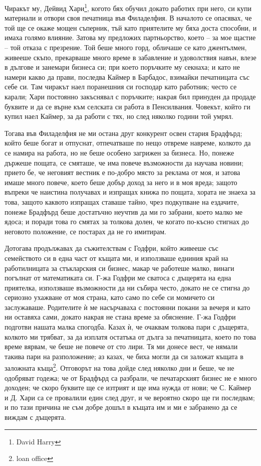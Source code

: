 \documentclass[12pt]{book}
\begin{document}
Чиракът му, Дейвид Хари\footnote{David Harry}, когото бях обучил докато работих при него, си купи материали и отвори своя печатница във Филаделфия. В началото се опасявах, че той ще се окаже мощен съперник, тъй като приятелите му бяха доста способни, и имаха голямо влияние. Затова му предложих партньорство, което – за мое щастие – той отказа с презрение. Той беше много горд, обличаше се като джентълмен, живееше скъпо, прекарваше много време в забавление и удоволствия навън, влезе в дългове и занемари бизнеса си; при което поръчките му секнаха; и като не намери какво да прави, последва Каймер в Барбадос, взимайки печатницата със себе си. Там чиракът наел поранешния си господар като работник; често се карали; Хари постоянно закъснявал с поръчките; накрая бил принуден да продаде буквите и да се върне към селската си работа в Пенсилвания. Човекът, който ги купил наел Каймер, за да работи с тях, но след няколко години той умрял.

Тогава във Филаделфия не ми остана друг конкурент освен стария Брадфърд; който беше богат и отпуснат, отпечатваше по нещо отвреме навреме, колкото да се намира на работа, но не беше особено загрижен за бизнеса. Но, понеже държеше пощата, се смяташе, че има повече възможности да научава новини; прието бе, че неговият вестник е по-добро място за реклама от моя, и затова имаше много повече, което беше добър доход за него и в моя вреда; защото въпреки че наистина получавах и изпращах книжа по пощата, хората не знаеха за това, защото каквото изпращах ставаше тайно, чрез подкупване на ездачите, понеже Брадфърд беше достатъчно неучтив да ми го забрани, което малко ме ядоса; и поради това го смятах за толкова долен, че когато по-късно стигнах до неговото положение, се постарах да не го имитирам.

Дотогава продължавах да съжителствам с Годфри, който живееше със семейството си в една част от къщата ми, и използваше едниния край на работилницата  за стъкларския си бизнес, макар че работеше малко, винаги погълнат от математиката си. Г-жа Годфри ме сватоса с дъщерята на една приятелка, използваше възможности да ни събира често, докато не се стигна до сериозно ухажване от моя страна, като само по себе си момичето си заслужаваше. Родителите ѝ ме насърчаваха с постоянни покани за вечеря и като ни оставяха сами, докато накрая не стана време за обяснение. Г-жа Годфри подготви нашата малка спогодба. Казах ѝ, че очаквам толкова пари с дъщерята, колкото ми трябват, за да изплатя остатъка от дълга за печатницата, което по това време вярвам, че беше не повече от сто лири. Тя ми донесе вест, че нямали такива пари на разположение; аз казах, че биха могли да си заложат къщата в заложната къща\footnote{loan office}. Отговорът на това дойде след няколко дни и беше, че не одобряват годежа; че от Брадфърд са разбрали, че печатарският бизнес не е много доходен; че скоро буквите ще се изтрият и ще има нужда от нови; че С. Каймер и Д. Хари са се провалили един след друг, и че вероятно скоро ще ги последвам; и по тази причина не съм добре дошъл в къщата им и ми е забранено да се виждам с дъщерята.
\end{document}
